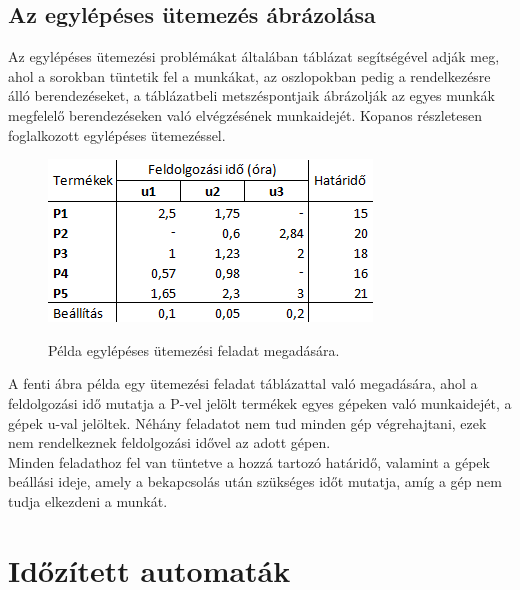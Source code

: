 \documentclass {report}
\begin{document}
\section{Az egylépéses ütemezés ábrázolása}
Az egylépéses ütemezési problémákat általában táblázat segítségével adják meg, ahol a sorokban tüntetik fel a munkákat, az oszlopokban pedig a rendelkezésre álló berendezéseket, a táblázatbeli metszéspontjaik ábrázolják az egyes munkák megfelelő berendezéseken való elvégzésének munkaidejét. Kopanos részletesen foglalkozott egylépéses ütemezéssel. \\
\begin{figure}[h]
\begin{center}
\includegraphics{tablazat1}\\
\caption{Példa egylépéses ütemezési feladat megadására.}
\end{center}
\end{figure}

A fenti ábra példa egy ütemezési feladat táblázattal való megadására, ahol a feldolgozási idő mutatja a P-vel jelölt termékek egyes gépeken való munkaidejét, a gépek u-val jelöltek. Néhány feladatot nem tud minden gép végrehajtani, ezek nem rendelkeznek feldolgozási idővel az adott gépen. \\
Minden feladathoz fel van tüntetve a hozzá tartozó határidő, valamint a gépek beállási ideje, amely a bekapcsolás után szükséges időt mutatja, amíg a gép nem tudja elkezdeni a munkát. 

\chapter{Időzített automaták}
\end{document}

